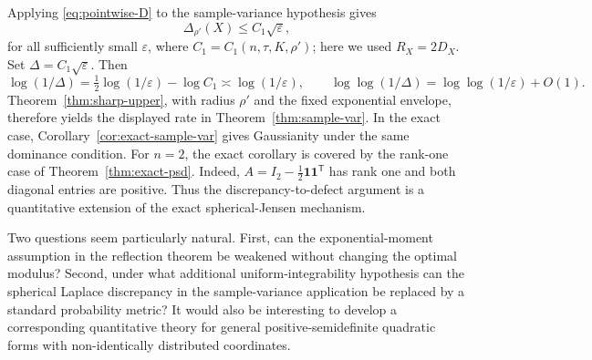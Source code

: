 Applying \eqref{eq:pointwise-D} to the sample-variance hypothesis gives
\[
\Delta_{\rho'}(X)
\le C_1\sqrt{\varepsilon},
\]
for all sufficiently small $\varepsilon$, where
$C_1=C_1(n,\tau,K,\rho')$; here we used $R_X=2D_X$.
Set $\Delta=C_1\sqrt{\varepsilon}$. Then
\[
\log(1/\Delta)=\tfrac12\log(1/\varepsilon)-\log C_1
\asymp \log(1/\varepsilon),
\qquad
\log\log(1/\Delta)=\log\log(1/\varepsilon)+O(1).
\]
Theorem~\ref{thm:sharp-upper}, with radius $\rho'$ and the fixed exponential envelope, therefore yields the displayed rate in Theorem~\ref{thm:sample-var}. In the exact case, Corollary~\ref{cor:exact-sample-var} gives Gaussianity under the same dominance condition. For $n=2$, the exact corollary is covered by the rank-one case of Theorem~\ref{thm:exact-psd}. Indeed, $A=I_2-\frac12\mathbf1\mathbf1^{\mathsf T}$ has rank one and both diagonal entries are positive. Thus the discrepancy-to-defect argument is a quantitative extension of the exact spherical-Jensen mechanism.

Two questions seem particularly natural. First, can the exponential-moment assumption in the reflection theorem be weakened without changing the optimal modulus? Second, under what additional uniform-integrability hypothesis can the spherical Laplace discrepancy in the sample-variance application be replaced by a standard probability metric? It would also be interesting to develop a corresponding quantitative theory for general positive-semidefinite quadratic forms with non-identically distributed coordinates.
